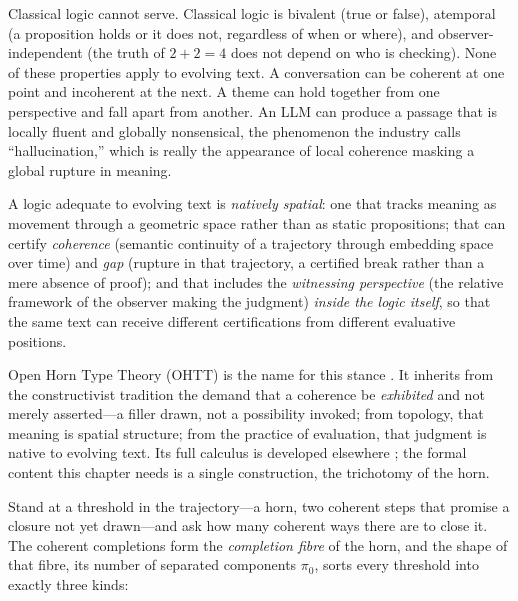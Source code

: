 Classical logic cannot serve.  Classical logic is bivalent (true or false), atemporal (a proposition holds or it does not, regardless of when or where), and observer-independent (the truth of $2 + 2 = 4$ does not depend on who is checking).  None of these properties apply to evolving text.  A conversation can be coherent at one point and incoherent at the next.  A theme can hold together from one perspective and fall apart from another.  An LLM can produce a passage that is locally fluent and globally nonsensical, the phenomenon the industry calls ``hallucination,'' which is really the appearance of local coherence masking a global rupture in meaning.

A logic adequate to evolving text is \textit{natively spatial}: one that tracks meaning as movement through a geometric space rather than as static propositions; that can certify \textit{coherence} (semantic continuity of a trajectory through embedding space over time) and \textit{gap} (rupture in that trajectory, a certified break rather than a mere absence of proof); and that includes the \textit{witnessing perspective} (the relative framework of the observer making the judgment) \textit{inside the logic itself}, so that the same text can receive different certifications from different evaluative positions.

Open Horn Type Theory (OHTT) is the name for this stance \cite{poernomo2025ohtt}.  It inherits from the constructivist tradition the demand that a coherence be \textit{exhibited} and not merely asserted---a filler drawn, not a possibility invoked; from topology, that meaning is spatial structure; from the practice of evaluation, that judgment is native to evolving text.  Its full calculus is developed elsewhere \cite{poernomo2025ohtt}; the formal content this chapter needs is a single construction, the trichotomy of the horn.

Stand at a threshold in the trajectory---a horn, two coherent steps that promise a closure not yet drawn---and ask how many coherent ways there are to close it.  The coherent completions form the \textit{completion fibre} of the horn, and the shape of that fibre, its number of separated components $\pi_0$, sorts every threshold into exactly three kinds:

